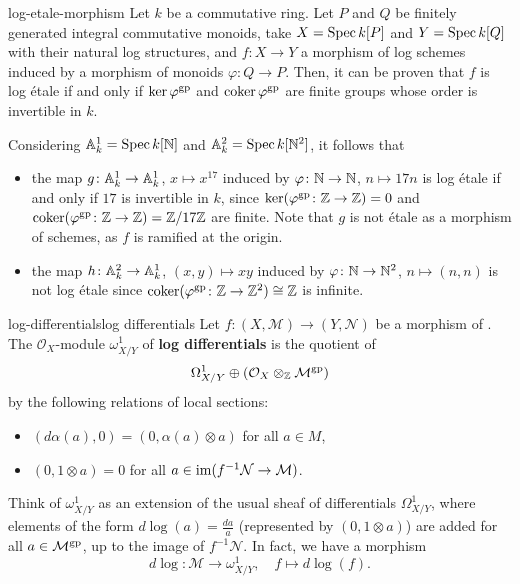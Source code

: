 \begin{example}{log-etale-morphism}
    Let $k$ be a commutative ring. Let $P$ and $Q$ be finitely generated integral commutative monoids, take $X = \Spec k[P]$ and $Y = \Spec k[Q]$ with their natural log structures, and $f \colon X \to Y$ a morphism of log schemes induced by a morphism of monoids $\varphi \colon Q \to P$. Then, it can be proven that $f$ is log étale if and only if $\ker \varphi^\textup{gp}$ and $\coker \varphi^\textup{gp}$ are finite groups whose order is invertible in $k$.
    
    Considering $\AA^1_k = \Spec k[\NN]$ and $\AA^2_k = \Spec k[\NN^2]$, it follows that
    \begin{itemize}
        \item the map $g \colon \AA^1_k \to \AA^1_k$, $x \mapsto x^{17}$ induced by $\varphi \colon \NN \to \NN$, $n \mapsto 17n$ is log étale if and only if $17$ is invertible in $k$, since $\ker(\varphi^\textup{gp} \colon \ZZ \to \ZZ) = 0$ and $\coker(\varphi^\textup{gp} \colon \ZZ \to \ZZ) = \ZZ / 17 \ZZ$ are finite. Note that $g$ is not étale as a morphism of schemes, as $f$ is ramified at the origin.
        \item the map $h \colon \AA^2_k \to \AA^1_k$, $(x, y) \mapsto xy$ induced by $\varphi \colon \NN \to \NN^2$, $n \mapsto (n, n)$ is not log étale since $\coker(\varphi^\textup{gp} \colon \ZZ \to \ZZ^2) \isom \ZZ$ is infinite.
    \end{itemize}
\end{example}

\begin{topic}{log-differentials}{log differentials}
    Let $f \colon (X, \mathcal{M}) \to (Y, \mathcal{N})$ be a morphism of . The $\mathcal{O}_X$-module $\omega^1_{X/Y}$ of \textbf{log differentials} is the quotient of
    \[ \Omega_{X/Y}^1 \oplus (\mathcal{O}_X \otimes_\ZZ \mathcal{M}^\textup{gp}) \]
    by the following relations of local sections:
    \begin{itemize}
        \item $(d \alpha(a), 0) = (0, \alpha(a) \otimes a)$ for all $a \in M$,
        \item $(0, 1 \otimes a) = 0$ for all $a \in \im(f^{-1} \mathcal{N} \to \mathcal{M})$.
    \end{itemize}
    
    Think of $\omega^1_{X/Y}$ as an extension of the usual sheaf of differentials $\Omega_{X/Y}^1$, where elements of the form $d \log(a) = \frac{da}{a}$ (represented by $(0, 1 \otimes a)$) are added for all $a \in \mathcal{M}^\textup{gp}$, up to the image of $f^{-1} \mathcal{N}$. In fact, we have a morphism
    \[ d \log \colon \mathcal{M} \to \omega_{X/Y}^1, \quad f \mapsto d \log(f) . \]
\end{topic}

